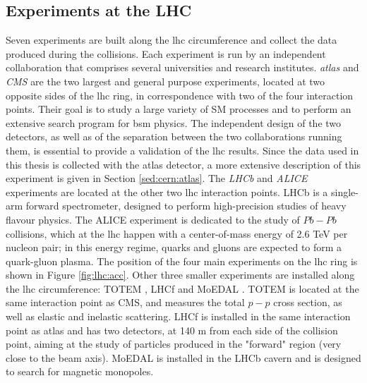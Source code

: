 \subsection{Experiments at the LHC}

Seven experiments are built along the \gls{lhc} circumference and collect the data produced during the collisions. Each experiment is run by an independent collaboration that comprises several universities and research institutes. 
\textit{\gls{atlas}} \cite{atlas:atlas} and \textit{CMS} \cite{cms:cms} are the two largest and general purpose experiments, located at two opposite sides of the \gls{lhc} ring, in correspondence with two of the four interaction points. Their goal is to study a large variety of SM processes and to perform an extensive search program for \gls{bsm} physics. The independent design of the two detectors, as well as of the separation between the two collaborations running them, is essential to provide a validation of the \gls{lhc} results. Since the data used in this thesis is collected with the \gls{atlas} detector, a more extensive description of this experiment is given in Section \ref{sed:cern:atlas}. 
The \textit{LHCb} \cite{lhcb:lhcb} and \textit{ALICE} \cite{alice:alice} experiments are located at the other two \gls{lhc} interaction points. LHCb is a single-arm forward spectrometer, designed to perform high-precision studies of heavy flavour physics. The ALICE experiment is dedicated to the study of $Pb-Pb$ collisions, which at the \gls{lhc} happen with a center-of-mass energy of 2.6 TeV per nucleon pair; in this energy regime, quarks and gluons are expected to form a quark-gluon plasma.
The position of the four main experiments on the \gls{lhc} ring is shown in Figure \ref{fig:lhc:acc}.
Other three smaller experiments are installed along the \gls{lhc} circumference: TOTEM \cite{totem:totem}, LHCf \cite{lhcf:lhcf} and MoEDAL \cite{moedal:moedal}. TOTEM is located at the same interaction point as CMS, and measures the total $p-p$ cross section, as well as elastic and inelastic scattering. LHCf is installed in the same interaction point as \gls{atlas} and has two detectors, at 140 m from each side of the collision point, aiming at the study of particles produced in the "forward" region (very close to the beam axis). MoEDAL is installed in the LHCb cavern and is designed to search for magnetic monopoles.  





